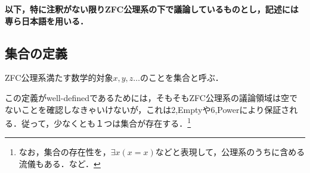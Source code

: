 \documentclass[uplatex, 12pt, a4paper, dvipdfmx]{jsreport}
\begin{document}
\textbf{以下，特に注釈がない限りZFC公理系の下で議論しているものとし，記述には専ら日本語を用いる．}

\subsection{集合の定義}

\begin{shadebox}\begin{definition}[集合(メタ理論)]
	ZFC公理系満たす数学的対象$x,y,z\dots$のことを集合と呼ぶ．
\end{definition}\end{shadebox}
この定義がwell-definedであるためには，そもそもZFC公理系の議論領域は空でないことを確認しなきゃいけないが，これは2,Emptyや6,Powerにより保証される．従って，少なくとも１つは集合が存在する．\footnote{なお，集合の存在性を，$\exists x(x=x)$などと表現して，公理系のうちに含める流儀もある．\cite{Kunen}など．}
\end{document}
